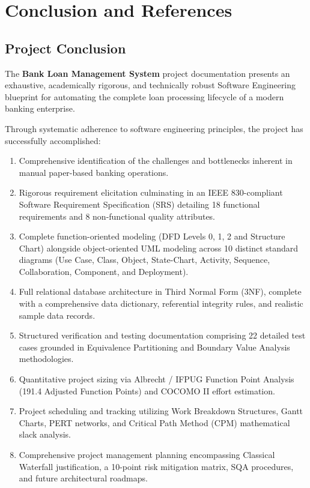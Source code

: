 \documentclass[12pt,a4paper,oneside]{report}
\begin{document}
\chapter{Conclusion and References}

\section{Project Conclusion}

The \textbf{Bank Loan Management System} project documentation presents an exhaustive, academically rigorous, and technically robust Software Engineering blueprint for automating the complete loan processing lifecycle of a modern banking enterprise.

Through systematic adherence to software engineering principles, the project has successfully accomplished:

\begin{enumerate}
  \item Comprehensive identification of the challenges and bottlenecks inherent in manual paper-based banking operations.
  \item Rigorous requirement elicitation culminating in an IEEE 830-compliant Software Requirement Specification (SRS) detailing 18 functional requirements and 8 non-functional quality attributes.
  \item Complete function-oriented modeling (DFD Levels 0, 1, 2 and Structure Chart) alongside object-oriented UML modeling across 10 distinct standard diagrams (Use Case, Class, Object, State-Chart, Activity, Sequence, Collaboration, Component, and Deployment).
  \item Full relational database architecture in Third Normal Form (3NF), complete with a comprehensive data dictionary, referential integrity rules, and realistic sample data records.
  \item Structured verification and testing documentation comprising 22 detailed test cases grounded in Equivalence Partitioning and Boundary Value Analysis methodologies.
  \item Quantitative project sizing via Albrecht / IFPUG Function Point Analysis (191.4 Adjusted Function Points) and COCOMO II effort estimation.
  \item Project scheduling and tracking utilizing Work Breakdown Structures, Gantt Charts, PERT networks, and Critical Path Method (CPM) mathematical slack analysis.
  \item Comprehensive project management planning encompassing Classical Waterfall justification, a 10-point risk mitigation matrix, SQA procedures, and future architectural roadmaps.
\end{enumerate}
\end{document}
